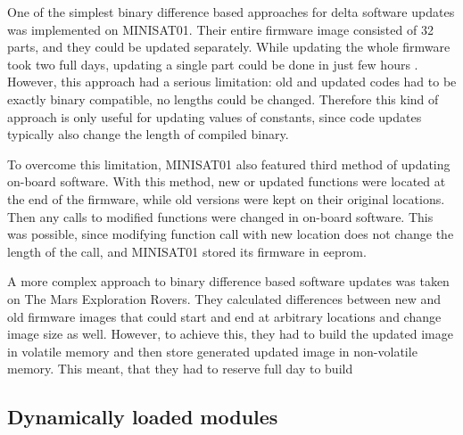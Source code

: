 
One of the simplest binary difference based approaches for delta software updates was implemented on MINISAT01. Their entire firmware image consisted of 32 parts, and they could be updated separately. While updating the whole firmware took two full days, updating a single part could be done in just few hours \cite{Garrido1998}. However, this approach had a serious limitation: old and updated codes had to be exactly binary compatible, no lengths could be changed. Therefore this kind of approach is only useful for updating values of constants, since code updates typically also change the length of compiled binary.

To overcome this limitation, MINISAT01 also featured third method of updating on-board software. With this method, new or updated functions were located at the end of the firmware, while old versions were kept on their original locations. Then any calls to modified functions were changed in on-board software. This was possible, since modifying function call with new location does not change the length of the call, and MINISAT01 stored its firmware in \gls{eeprom}. \cite{Garrido1998} 

A more complex approach to binary difference based software updates was taken on The Mars Exploration Rovers. They calculated differences between new and old firmware images that could start and end at arbitrary locations and change image size as well. However, to achieve this, they had to build the updated image in volatile memory and then store generated updated image in non-volatile memory. This meant, that they had to reserve full day to build 

\subsection{Dynamically loaded modules}



